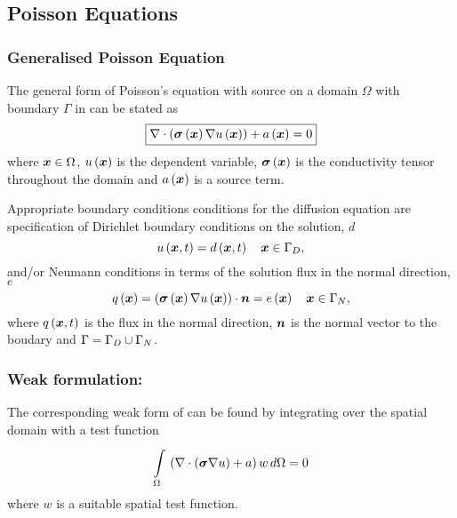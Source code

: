 \subsection{Poisson Equations} 

\subsubsection{Generalised Poisson Equation} 


The general form of Poisson's equation with source on a domain $\Omega$ with boundary
$\Gamma$ in \OpenCMISS can be stated as
\begin{equation}
  \boxed{
    \diverg{\pbrac{\fnof{\tensor{\sigma}}{\vect{x}}\gradient{\fnof{u}{\vect{x}}}}}+
    \fnof{a}{\vect{x}}=0
  }
  \label{eqn:Poissonequation}
\end{equation}
where $\vect{x}\in\Omega$, $\fnof{u}{\vect{x}}$ is the dependent variable, 
$\fnof{\tensor{\sigma}}{\vect{x}}$ is the conductivity tensor throughout 
the domain and $\fnof{a}{\vect{x}}$ is a source term.

Appropriate boundary conditions conditions for the diffusion
equation are specification of Dirichlet boundary conditions on the solution,
$d$ \ie
\begin{equation}
  \fnof{u}{\vect{x},t} = \fnof{d}{\vect{x},t} \quad \vect{x}\in\Gamma_{D},
  \label{eqn:PoissonDirichletBC} 
\end{equation}
and/or Neumann conditions in terms of the solution flux in the normal
direction, $e$ \ie
\begin{equation}
  \fnof{q}{\vect{x}} = \dotprod{\pbrac{\fnof{\tensor{\sigma}}{\vect{x}}
      \gradient{\fnof{u}{\vect{x}}}}}{\normal} =
  \fnof{e}{\vect{x}} \quad \vect{x}\in\Gamma_{N},
  \label{eqn:PoissonNeumannBC} 
\end{equation}
where $\fnof{q}{\vect{x},t}$ is the flux in the normal direction, $\normal$ is the normal
vector to the boudary and $\Gamma=\Gamma_{D}\cup\Gamma_{N}$.

\subsubsection{Weak formulation:}

The corresponding weak form of  can be found by
integrating over the spatial domain with a test function \ie
\begin{equation}
    \displaystyle\int\limits_{\Omega}^{} \,\left(  \nabla\cdot\left( \boldsymbol{\sigma}\nabla u \right) +a \right)w\,d\Omega =0
  \label{eqn:Poissonweakform1}
\end{equation}
where $w$ is a suitable spatial test function.

